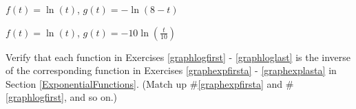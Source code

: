 \documentclass{ximera}
\begin{document}
\begin{question}
\begin{problem}
\begin{solution}

\end{solution}
\end{problem}

\begin{problem}
$f(t) = \ln(t)$, $g(t) = -\ln(8-t)$
\end{problem}

\begin{problem}\label{graphloglast}
$f(t) = \ln(t)$, $g(t) = -10\ln\left(\frac{t}{10}\right)$ 
\end{problem}

\end{question}

\begin{problem}
Verify that each function in Exercises \ref{graphlogfirst} - \ref{graphloglast} is the inverse of the corresponding function in Exercises \ref{graphexpfirsta} - \ref{graphexplasta} in Section \ref{ExponentialFunctions}.  (Match up \#\ref{graphexpfirsta} and \#\ref{graphlogfirst}, and so on.)    
\end{problem}
  
\end{document}
